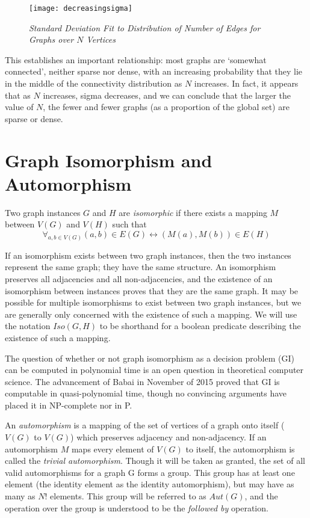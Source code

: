 \begin{figure}[h]
\caption{\emph{Standard Deviation Fit to Distribution of Number of Edges for Graphs over $N$ Vertices}}
\centering
\texttt{[image: decreasingsigma]}
\label{fig:decreasingsigma}
\end{figure}

This establishes an important relationship: most graphs are `somewhat connected', neither sparse nor dense, with an increasing probability that they lie in the middle of the connectivity distribution as $N$ increases.
In fact, it appears that as $N$ increases, sigma decreases, and we can conclude that the larger the value of $N$, the fewer and fewer graphs (as a proportion of the global set) are sparse or dense.

\section{Graph Isomorphism and Automorphism}

Two graph instances $G$ and $H$ are \emph{isomorphic} if there exists a mapping $M$ between $V(G)$ and $V(H)$ such that $$\forall_{a, b \in V(G)} (a, b) \in E(G) \leftrightarrow (M(a), M(b)) \in E(H)$$

If an isomorphism exists between two graph instances, then the two instances represent the same graph; they have the same structure.
An isomorphism preserves all adjacencies and all non-adjacencies, and the existence of an isomorphism between instances proves that they are the same graph.
It may be possible for multiple isomorphisms to exist between two graph instances, but we are generally only concerned with the existence of such a mapping.
We will use the notation $Iso(G, H)$ to be shorthand for a boolean predicate describing the existence of such a mapping.

The question of whether or not graph isomorphism as a decision problem (GI) can be computed in polynomial time is an open question in theoretical computer science.
The advancement of Babai in November of 2015 proved that GI is computable in quasi-polynomial time, though no convincing arguments have placed it in NP-complete nor in P.

An \emph{automorphism} is a mapping of the set of vertices of a graph onto itself ($V(G)$ to $V(G)$) which preserves adjacency and non-adjacency.
If an automorphism $M$ maps every element of $V(G)$ to itself, the automorphism is called the \emph{trivial automorphism}.
Though it will be taken as granted, the set of all valid automorphisms for a graph G forms a group.
This group has at least one element (the identity element as the identity automorphism), but may have as many as $N!$ elements.
This group will be referred to as $Aut(G)$, and the operation over the group is understood to be the \emph{followed by} operation.



